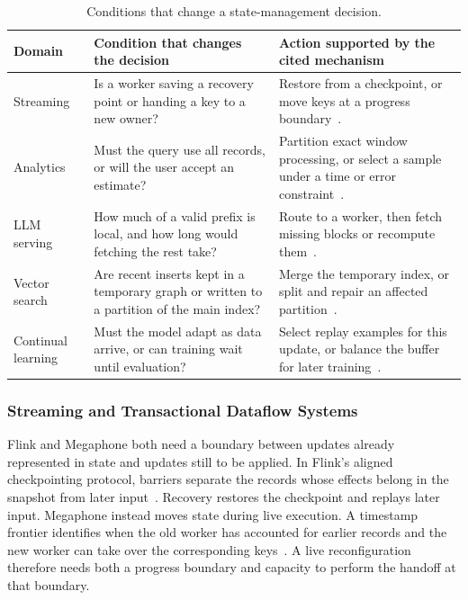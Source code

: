 \documentclass[manuscript]{acmart}
\begin{document}
\begin{table}[t]
\small
\centering
\setlength{\tabcolsep}{4pt}
\caption{Conditions that change a state-management decision.}
\label{tab:comparison-guide}
\begin{tabular}{@{}p{}p{}p{}@{}}
\toprule
Domain & Condition that changes the decision & Action supported by the cited mechanism \\
\midrule
Streaming & Is a worker saving a recovery point or handing a key to a new owner? & Restore from a checkpoint, or move keys at a progress boundary~\cite{carbone2015flink,nasir2019megaphone}. \\
Analytics & Must the query use all records, or will the user accept an estimate? & Partition exact window processing, or select a sample under a time or error constraint~\cite{zhang2020finestream,agarwal2013blinkdb}. \\
LLM serving & How much of a valid prefix is local, and how long would fetching the rest take? & Route to a worker, then fetch missing blocks or recompute them~\cite{qin2025mooncake,hu2024memserve}. \\
Vector search & Are recent inserts kept in a temporary graph or written to a partition of the main index? & Merge the temporary index, or split and repair an affected partition~\cite{singh2021freshdiskann,xu2023spfresh}. \\
Continual learning & Must the model adapt as data arrive, or can training wait until evaluation? & Select replay examples for this update, or balance the buffer for later training~\cite{aljundi2019mir,prabhu2020gdumb}. \\
\bottomrule
\end{tabular}
\end{table}

\subsubsection{Streaming and Transactional Dataflow Systems}

Flink and Megaphone both need a boundary between updates already represented in state and updates still to be applied. In Flink's aligned checkpointing protocol, barriers separate the records whose effects belong in the snapshot from later input~\cite{carbone2015flink,carbone2015asynchronous}. Recovery restores the checkpoint and replays later input. Megaphone instead moves state during live execution. A timestamp frontier identifies when the old worker has accounted for earlier records and the new worker can take over the corresponding keys~\cite{nasir2019megaphone}. A live reconfiguration therefore needs both a progress boundary and capacity to perform the handoff at that boundary.
\end{document}
